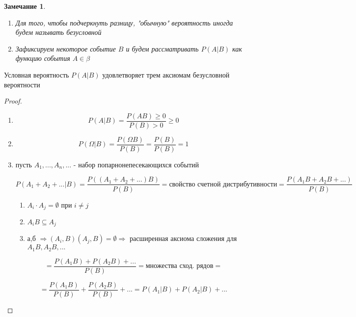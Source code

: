 \documentclass[a4paper, 14pt]{report}
\newtheorem{note}{Замечание}[chapter]
\begin{document}
\begin{note}
    \begin{enumerate}
        \item Для того, чтобы подчеркнуть разницу, "обычную" вероятность иногда будем называть безусловной
        \item Зафиксируем некоторое событие $B$ и будем рассматривать $P(A|B)$ как функцию события $A \in \beta$
    \end{enumerate}
\end{note}

\begin{theorem}
    Условная вероятность $P(A|B)$ удовлетворяет трем аксиомам безусловной вероятности 
\end{theorem}

\begin{proof}
    \begin{enumerate}
        \item 
            $$
            P(A|B) = \frac{P(AB) \geq 0}{P(B) > 0} \geq 0
            $$

        \item
            $$
            P(\Omega|B) = \frac{P(\Omega B)}{P(B)} = \frac{P(B)}{P(B)} = 1
            $$

        \item пусть $A_1, ..., A_n,...$ - набор попарнонепесекающихся событий

            $$
            P(A_1 + A_2 + ... | B) = \frac{P((A_1 + A_2 + ...)B)}{P(B)} = \text{свойство счетной дистрибутивности} = \frac{P(A_1B + A_2B + ...)}{P(B)}
            $$

            \begin{enumerate}
                \item $A_i \cdot A_j = \emptyset \text{ при } i \ne j$
                \item $A_iB \subseteq A_j$
                \item а,б $\Rightarrow (A_i, B)(A_j, B) = \emptyset \Rightarrow$ расширенная аксиома сложения для $A_1B, A_2B, ...$
            \end{enumerate}

            $$
            = \frac{P(A_1B) + P(A_2B) + ...}{P(B)} = \text{множества сход. рядов} = 
            $$

            $$
            = \frac{P(A_1B)}{P(B)} + \frac{P(A_2B)}{P(B)} + ... = P(A_1|B) + P(A_2|B) + ...
            $$
    \end{enumerate} 
\end{proof}
\end{document}
